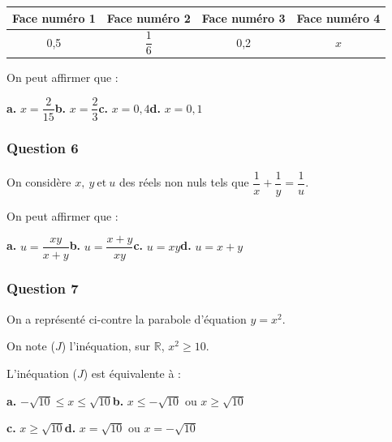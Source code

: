 \begin{center}
\begin{tabular}{|c|c|c|c|}
\hline
Face numéro 1 & Face numéro 2 & Face numéro 3 & Face numéro 4 \\
\hline
0,5 & $\dfrac{1}{6}$ & 0,2 & $x$ \\
\hline
\end{tabular}
\end{center}

On peut affirmer que :

\textbf{a.} $x = \dfrac{2}{15}$\hfill \textbf{b.} $x = \dfrac{2}{3}$\hfill \textbf{c.} $x = 0,4$\hfill \textbf{d.} $x = 0,1$

\subsubsection*{Question 6}
On considère $x,~y~\text{et}~u$ des réels non nuls tels que $\dfrac{1}{x} + \dfrac{1}{y} = \dfrac{1}{u}.$

On peut affirmer que :

\textbf{a.} $u = \dfrac{xy}{x+y}$\hfill \textbf{b.} $u = \dfrac{x+y}{xy}$\hfill \textbf{c.} $u = xy$\hfill \textbf{d.} $u = x+y$

\subsubsection*{Question 7}

\begin{minipage}[t]{0.6\textwidth}
On a représenté ci-contre la parabole d'équation $y = x^2$.

On note ($J$) l'inéquation, sur $\mathbb{R}$, $x^2 \geq 10$.

\smallskip

L'inéquation ($J$) est équivalente à :

\smallskip

\textbf{a.} $-\sqrt{10} \leq x \leq \sqrt{10}$\hfill \textbf{b.} $x \leq -\sqrt{10}$ ou $x \geq \sqrt{10}$

\smallskip

\textbf{c.} $x \geq \sqrt{10}$\hfill \textbf{d.} $x = \sqrt{10}$ ou $x = -\sqrt{10}$
\end{minipage}
\hfill
\begin{minipage}[t]{0.35\textwidth}
\vspace{0pt}
\begin{center}
\end{center}
\end{minipage}

